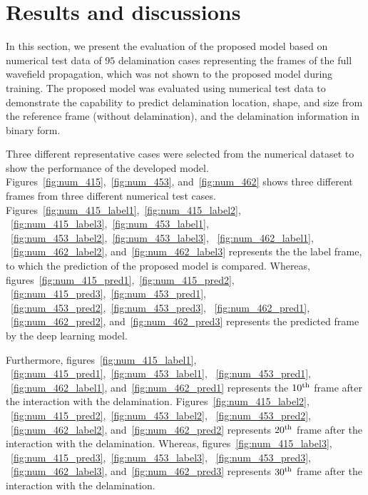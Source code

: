 \section{Results and discussions}
In this section, we present the evaluation of the proposed model based 
on numerical test data of \(95\) delamination cases representing the frames of 
the full wavefield propagation, which was not shown to the proposed model 
during training. 
The proposed model was evaluated using numerical test data to 
demonstrate the capability to predict delamination location, shape, and size 
from the reference frame (without delamination), and the delamination 
information in binary form.

Three different representative cases were selected from the numerical dataset 
to show the performance of the developed model.
Figures~\ref{fig:num_415},~\ref{fig:num_453}, 
and~\ref{fig:num_462} shows three different frames from three different 
numerical test cases.  
Figures~\ref{fig:num_415_label1},~\ref{fig:num_415_label2},
~\ref{fig:num_415_label3},~\ref{fig:num_453_label1},
~\ref{fig:num_453_label2},~\ref{fig:num_453_label3},
~\ref{fig:num_462_label1}, ~\ref{fig:num_462_label2}, 
and~\ref{fig:num_462_label3} represents the the label frame, to which 
the prediction of the proposed model is compared.
Whereas, 
figures~\ref{fig:num_415_pred1},~\ref{fig:num_415_pred2},
~\ref{fig:num_415_pred3},~\ref{fig:num_453_pred1},
~\ref{fig:num_453_pred2},~\ref{fig:num_453_pred3},
~\ref{fig:num_462_pred1}, ~\ref{fig:num_462_pred2}, 
and~\ref{fig:num_462_pred3} represents the predicted frame by the deep 
learning model. 

Furthermore, figures~\ref{fig:num_415_label1}, 
~\ref{fig:num_415_pred1},~\ref{fig:num_453_label1},
~\ref{fig:num_453_pred1}, 
~\ref{fig:num_462_label1}, and~\ref{fig:num_462_pred1} represents the 
$10\textsuperscript{th}$ frame after the interaction with the delamination. 
Figures~\ref{fig:num_415_label2}, 
~\ref{fig:num_415_pred2},~\ref{fig:num_453_label2},
~\ref{fig:num_453_pred2}, ~\ref{fig:num_462_label2}, 
and~\ref{fig:num_462_pred2} represents $20\textsuperscript{th}$ frame 
after the interaction with the delamination.
Whereas, figures~\ref{fig:num_415_label3}, 
~\ref{fig:num_415_pred3},~\ref{fig:num_453_label3},
~\ref{fig:num_453_pred3}, ~\ref{fig:num_462_label3}, 
and~\ref{fig:num_462_pred3} represents $30\textsuperscript{th}$ frame 
after the interaction with the delamination.

